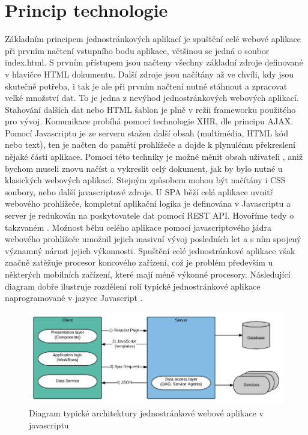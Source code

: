 \section{Princip technologie}
Základním principem jednostránkových aplikací je spuštění celé webové aplikace při prvním načtení vstupního bodu aplikace, většinou se jedná o soubor index.html. S prvním přístupem jsou načteny všechny základní zdroje definované v hlavičce HTML dokumentu. Další zdroje jsou načítány až ve chvíli, kdy jsou skutečně potřeba, i tak je ale při prvním načtení nutné stáhnout a zpracovat velké množství dat. To je jedna z nevýhod jednostránkových webových aplikací. Stahování dalších dat nebo HTML šablon je plně v režii frameworku použitého pro vývoj. Komunikace probíhá pomocí technologie XHR, dle principu AJAX. Pomocí Javascriptu je ze serveru stažen další obsah (multimédia, HTML kód nebo text), ten je načten do paměti prohlížeče a dojde k plynulému překreslení nějaké části aplikace. Pomocí této techniky je možné měnit obsah uživateli , aniž bychom museli znovu načíst a vykreslit celý dokument, jak by bylo nutné u klasických webových aplikací. Stejným způsobem mohou být načítány i CSS soubory, nebo další javascriptové zdroje. U SPA běží celá aplikace uvnitř webového prohlížeče, kompletní aplikační logika je definována v Javascriptu a server je redukován na poskytovatele dat pomocí REST API. Hovoříme tedy o takzvaném . Možnost běhu celého aplikace pomocí javascriptového jádra webového prohlížeče umožnil jejich masivní vývoj posledních let a s ním spojený významný nárust jejich výkonnosti. Spuštění celé jednostránkové aplikace však značně zatěžuje procesor koncového zařízení, což je problém především u některých mobilních zařízení, které mají méně výkonné procesory. Následující diagram dobře ilustruje rozdělení rolí typické jednostránkové aplikace naprogramované v jazyce Javascript \cite{spa_book} \cite{spa_web}.

\begin{figure}[h]
\begin{centering}
\includegraphics[scale=1]{obrazky/spa_architecture}
\par\end{centering}
\caption{Diagram typické architektury jednostránkové webové aplikace v javascriptu \cite{isomorhic_book} \label{fig:spa_architecture}}
\end{figure}

